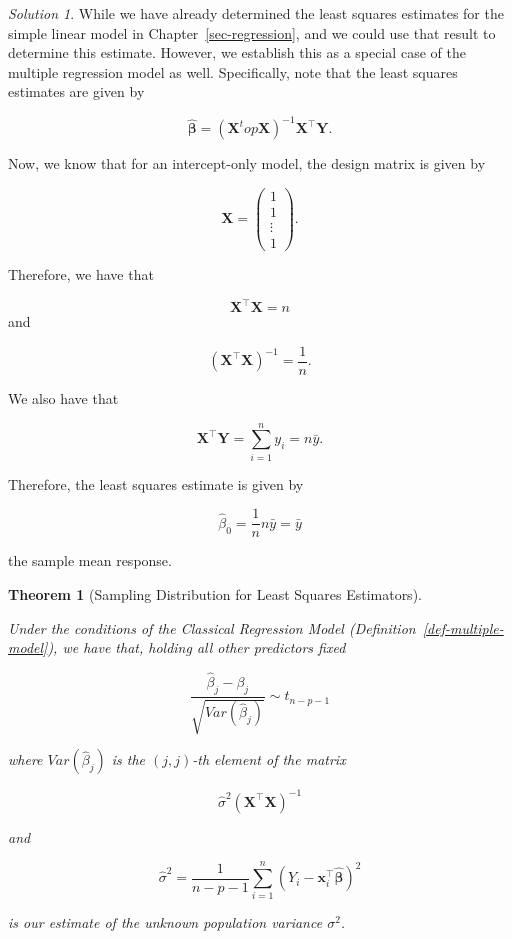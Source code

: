 \documentclass[
  letterpaper,
  DIV=11,
  numbers=noendperiod]{scrreprt}
\theoremstyle{definition}
\theoremstyle{plain}
\newtheorem{theorem}{Theorem}[chapter]
\theoremstyle{definition}
\theoremstyle{remark}
\newtheorem*{solution}{Solution}
\begin{document}
\begin{solution}
While we have already determined the least squares estimates for the
simple linear model in Chapter~\ref{sec-regression}, and we could use
that result to determine this estimate. However, we establish this as a
special case of the multiple regression model as well. Specifically,
note that the least squares estimates are given by

\[\widehat{\boldsymbol{\beta}} = \left(\mathbf{X}^top \mathbf{X}\right)^{-1} \mathbf{X}^\top \mathbf{Y}.\]

Now, we know that for an intercept-only model, the design matrix is
given by

\[\mathbf{X} = \begin{pmatrix} 1 \\ 1 \\ \vdots \\ 1 \end{pmatrix}.\]

Therefore, we have that

\[\mathbf{X}^\top \mathbf{X} = n\] and

\[
\left(\mathbf{X}^\top \mathbf{X}\right)^{-1} = \frac{1}{n}.
\]

We also have that

\[\mathbf{X}^\top \mathbf{Y} = \sum_{i=1}^{n} y_i = n\bar{y}.\]

Therefore, the least squares estimate is given by

\[
\widehat{\beta}_0 = \frac{1}{n} n \bar{y} = \bar{y}
\]

the sample mean response.
\end{solution}

\begin{theorem}[Sampling Distribution for Least Squares
Estimators]\protect\hypertarget{thm-classical-ls-multiple}{}\label{thm-classical-ls-multiple}

Under the conditions of the Classical Regression Model
(Definition~\ref{def-multiple-model}), we have that, holding all other
predictors fixed

\[\frac{\widehat{\beta}_j - \beta_j}{\sqrt{Var\left(\widehat{\beta}_j\right)}} \sim t_{n - p - 1}\]

where \(Var\left(\widehat{\beta}_j\right)\) is the \((j,j)\)-th element
of the matrix

\[\widehat{\sigma}^2 \left(\mathbf{X}^\top \mathbf{X}\right)^{-1}\]

and

\[\widehat{\sigma}^2 = \frac{1}{n - p - 1} \sum_{i=1}^{n} \left(Y_i - \mathbf{x}_i^\top \widehat{\boldsymbol{\beta}}\right)^2\]

is our estimate of the unknown population variance \(\sigma^2\).

\end{theorem}
\end{document}
